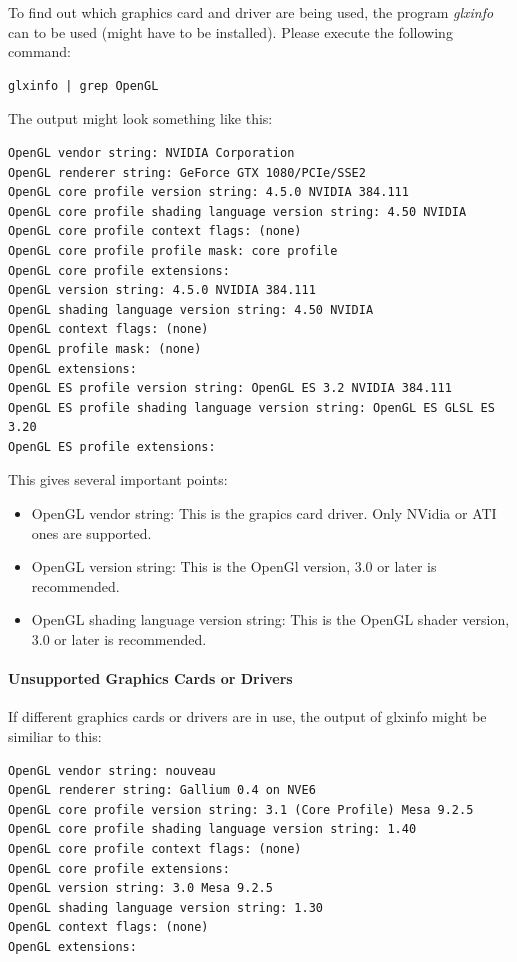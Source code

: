 To find out which graphics card and driver are being used, the program \textit{glxinfo} can to be used (might have to be installed). Please execute the following command:

\begin{lstlisting}
glxinfo | grep OpenGL
\end{lstlisting}

The output might look something like this:

\begin{lstlisting}
OpenGL vendor string: NVIDIA Corporation
OpenGL renderer string: GeForce GTX 1080/PCIe/SSE2
OpenGL core profile version string: 4.5.0 NVIDIA 384.111
OpenGL core profile shading language version string: 4.50 NVIDIA
OpenGL core profile context flags: (none)
OpenGL core profile profile mask: core profile
OpenGL core profile extensions:
OpenGL version string: 4.5.0 NVIDIA 384.111
OpenGL shading language version string: 4.50 NVIDIA
OpenGL context flags: (none)
OpenGL profile mask: (none)
OpenGL extensions:
OpenGL ES profile version string: OpenGL ES 3.2 NVIDIA 384.111
OpenGL ES profile shading language version string: OpenGL ES GLSL ES 3.20
OpenGL ES profile extensions:
\end{lstlisting}

This gives several important points:

\begin{itemize}  
\item OpenGL vendor string: This is the grapics card driver. Only NVidia or ATI ones are supported.
\item OpenGL version string: This is the OpenGl version, 3.0 or later is recommended.
\item OpenGL shading language version string: This is the OpenGL shader version, 3.0 or later is recommended.
\end{itemize}

\paragraph{Unsupported Graphics Cards or Drivers}

If different graphics cards or drivers are in use, the output of glxinfo might be similiar to this:

\begin{lstlisting}
OpenGL vendor string: nouveau
OpenGL renderer string: Gallium 0.4 on NVE6
OpenGL core profile version string: 3.1 (Core Profile) Mesa 9.2.5
OpenGL core profile shading language version string: 1.40
OpenGL core profile context flags: (none)
OpenGL core profile extensions:
OpenGL version string: 3.0 Mesa 9.2.5
OpenGL shading language version string: 1.30
OpenGL context flags: (none)
OpenGL extensions:
\end{lstlisting}

